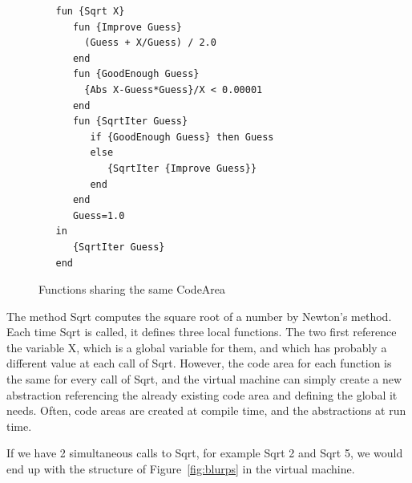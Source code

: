 \documentclass[a4paper]{memoir}
\begin{document}

\begin{figure}[h]
\begin{lstlisting}
   fun {Sqrt X}
      fun {Improve Guess}
        (Guess + X/Guess) / 2.0
      end
      fun {GoodEnough Guess}
        {Abs X-Guess*Guess}/X < 0.00001
      end
      fun {SqrtIter Guess}
         if {GoodEnough Guess} then Guess
         else
            {SqrtIter {Improve Guess}}
         end
      end
      Guess=1.0
   in
      {SqrtIter Guess}
   end
\end{lstlisting}
\caption{Functions sharing the same CodeArea}
\label{fig:code_area_sharing}
\end{figure}

The method Sqrt computes the square root of a number by Newton's method. Each time Sqrt is
called, it defines three local functions. The two first reference the variable
X, which is a global variable for them, and which has probably a different
value at each call of Sqrt. However, the code area for each function is the
same for every call of Sqrt, and the virtual machine can simply create a new
abstraction referencing the already existing code area and defining the global
it needs.  Often, code areas are created at compile time, and the abstractions at run time.

If we have 2 simultaneous calls to Sqrt, for example {Sqrt 2} and {Sqrt 5}, we
would end up with the structure of Figure~\ref{fig:blurps} 
in the virtual machine.
\end{document}
